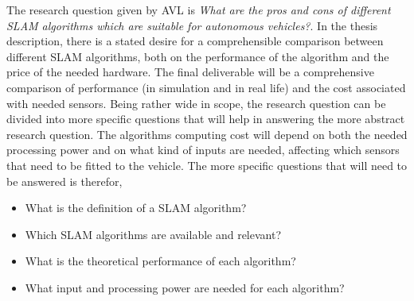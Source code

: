 The research question given by AVL is \textit{What are the pros and cons of
different SLAM algorithms which are suitable for autonomous vehicles?}.  In the
thesis description, there is a stated desire for a comprehensible comparison
between different SLAM algorithms, both on the performance of the algorithm and
the price of the needed hardware. The final deliverable will be a comprehensive
comparison of performance (in simulation and in real life) and the cost
associated with needed sensors. Being rather wide in scope, the research
question can be divided into more specific questions that will help in
answering the more abstract research question. The algorithms computing cost
will depend on both the needed processing power and on what kind of inputs are
needed, affecting which sensors that need to be fitted to the vehicle. The more
specific questions that will need to be answered is therefor, 
\begin{itemize}
    \item What is the definition of a SLAM algorithm?
    \item Which SLAM algorithms are available and relevant?
    \item What is the theoretical performance of each algorithm?
    \item What input and processing power are needed for each algorithm?
    \end{itemize}
